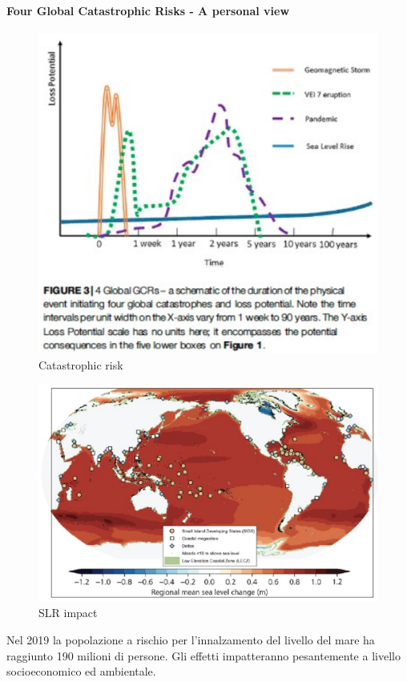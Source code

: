 \paragraph{Four Global Catastrophic Risks - A personal view}
\begin{figure}[htpb]
    \centering
    \includegraphics[width=0.5\linewidth]{uploads/catastrophic risk.png}
    \caption{Catastrophic risk}
\end{figure}
\begin{figure}[htpb]
    \centering
    \includegraphics[width=0.5\linewidth]{uploads/SLR impact.png}
    \caption{SLR impact}
\end{figure}
Nel 2019 la popolazione a rischio per l’innalzamento del livello del mare ha raggiunto 190 milioni di persone. Gli effetti impatteranno pesantemente a livello socioeconomico ed ambientale.
